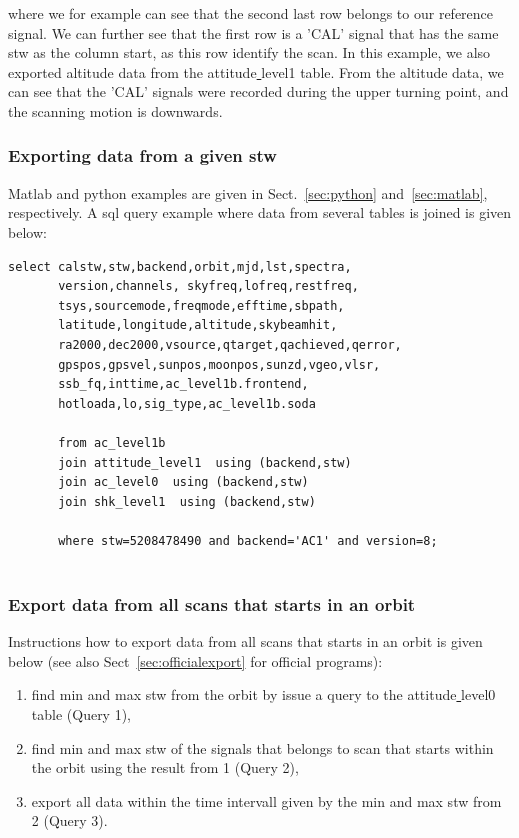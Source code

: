 \documentclass[12pt]{article}
\begin{document}
where we for example can see that the second last row belongs
to our reference signal. We can further see that the first row is a
'CAL' signal that has the same stw as the column start, as 
this row identify the scan.
In this example, we also exported altitude data from the 
attitude\underline{ }level1 table. 
From the altitude data, we can see that the 'CAL' signals were 
recorded during the upper turning point,
and the scanning motion is downwards.
\clearpage
\newpage
\subsubsection{Exporting data from a given stw}
Matlab and python examples are given in Sect.~\ref{sec:python}
and~\ref{sec:matlab}, respectively.
A sql query example where data from several 
tables is joined is given below: 
\begin{verbatim} 
select calstw,stw,backend,orbit,mjd,lst,spectra,
       version,channels, skyfreq,lofreq,restfreq,
       tsys,sourcemode,freqmode,efftime,sbpath,
       latitude,longitude,altitude,skybeamhit,  
       ra2000,dec2000,vsource,qtarget,qachieved,qerror,
       gpspos,gpsvel,sunpos,moonpos,sunzd,vgeo,vlsr,
       ssb_fq,inttime,ac_level1b.frontend,
       hotloada,lo,sig_type,ac_level1b.soda

       from ac_level1b
       join attitude_level1  using (backend,stw)
       join ac_level0  using (backend,stw)
       join shk_level1  using (backend,stw)
       
       where stw=5208478490 and backend='AC1' and version=8;


\end{verbatim}



\subsubsection{Export data from all scans that starts in an orbit}
Instructions how to export data from all scans that starts in an orbit
is given below (see also Sect~\ref{sec:officialexport} for official
programs):
\begin{enumerate}
\item find min and max stw from the orbit by issue a query to the
attitude\underline{ }level0 table (Query 1),
\item find min and max stw of the signals that belongs to scan
that starts within the orbit using the result from 1 (Query 2),
\item export all data within the time intervall given by the min and max stw
from 2 (Query 3).  
\end{enumerate}
\end{document}
